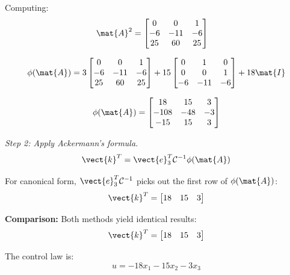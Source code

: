 Computing:
\begin{align}
\mat{A}^2 &= \begin{bmatrix} 0 & 0 & 1 \\ -6 & -11 & -6 \\ 25 & 60 & 25 \end{bmatrix}
\end{align}

\begin{equation}
\phi(\mat{A}) = 3\begin{bmatrix} 0 & 0 & 1 \\ -6 & -11 & -6 \\ 25 & 60 & 25 \end{bmatrix} +
15\begin{bmatrix} 0 & 1 & 0 \\ 0 & 0 & 1 \\ -6 & -11 & -6 \end{bmatrix} +
18\mat{I}
\end{equation}

\begin{equation}
\phi(\mat{A}) = \begin{bmatrix} 18 & 15 & 3 \\ -108 & -48 & -3 \\ -15 & 15 & 3 \end{bmatrix}
\end{equation}

\textit{Step 2: Apply Ackermann's formula.}
\begin{equation}
\vect{k}^T = \vect{e}_3^T\mathcal{C}^{-1}\phi(\mat{A})
\end{equation}

For canonical form, $\vect{e}_3^T\mathcal{C}^{-1}$ picks out the first row of $\phi(\mat{A})$:
\begin{equation}
\vect{k}^T = \begin{bmatrix} 18 & 15 & 3 \end{bmatrix}
\end{equation}

\textbf{Comparison:} Both methods yield identical results:
\begin{equation}
\vect{k}^T = \begin{bmatrix} 18 & 15 & 3 \end{bmatrix}
\end{equation}

The control law is:
\begin{equation}
u = -18x_1 - 15x_2 - 3x_3
\end{equation}

